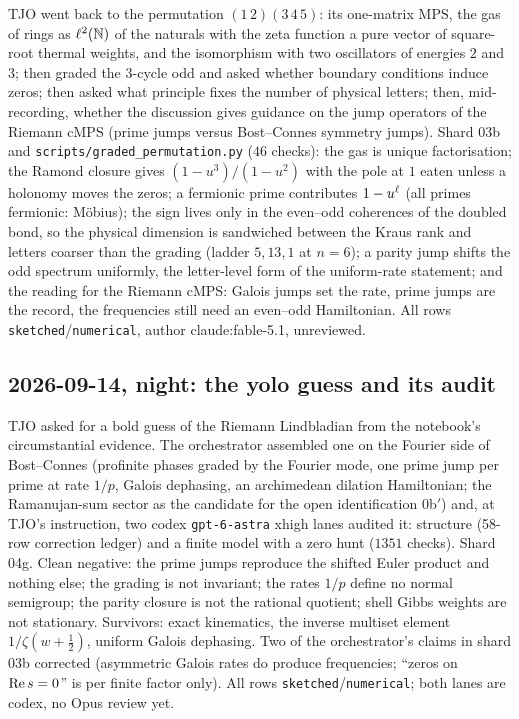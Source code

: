 TJO went back to the permutation $(1\,2)(3\,4\,5)$: its one-matrix MPS, the gas of rings as
$\ell^2(\mathbb N)$ of the naturals with the zeta function a pure vector of square-root thermal weights, and
the isomorphism with two oscillators of energies $2$ and $3$; then graded the $3$-cycle odd and
asked whether boundary conditions induce zeros; then asked what principle fixes the number of
physical letters; then, mid-recording, whether the discussion gives guidance on the jump operators
of the Riemann cMPS (prime jumps versus Bost--Connes symmetry jumps). Shard 03b and
\texttt{scripts/graded\_permutation.py} ($46$ checks): the gas is unique factorisation; the Ramond
closure gives $(1-u^3)/(1-u^2)$ with the pole at $1$ eaten unless a holonomy moves the zeros; a
fermionic prime contributes $1-u^{\ell}$ (all primes fermionic: M\"obius); the sign lives only in the
even--odd coherences of the doubled bond, so the physical dimension is sandwiched between the Kraus
rank and letters coarser than the grading (ladder $5,13,1$ at $n = 6$); a parity jump shifts the
odd spectrum uniformly, the letter-level form of the uniform-rate statement; and the reading for the
Riemann cMPS: Galois jumps set the rate, prime jumps are the record, the frequencies still need an
even--odd Hamiltonian. All rows \texttt{sketched}/\texttt{numerical}, author claude:fable-5.1, unreviewed.

\subsection*{2026-09-14, night: the yolo guess and its audit}

TJO asked for a bold guess of the Riemann Lindbladian from the notebook's circumstantial evidence.
The orchestrator assembled one on the Fourier side of Bost--Connes (profinite phases graded by the
Fourier mode, one prime jump per prime at rate $1/p$, Galois dephasing, an archimedean dilation
Hamiltonian; the Ramanujan-sum sector as the candidate for the open identification 0b$'$) and, at
TJO's instruction, two codex \texttt{gpt-6-astra} xhigh lanes audited it: structure (58-row correction
ledger) and a finite model with a zero hunt ($1351$ checks). Shard 04g. Clean negative: the prime jumps
reproduce the shifted Euler product and nothing else; the grading is not invariant; the rates $1/p$
define no normal semigroup; the parity closure is not the rational quotient; shell Gibbs weights are
not stationary. Survivors: exact kinematics, the inverse multiset element $1/\zeta(w+\tfrac12)$,
uniform Galois dephasing. Two of the orchestrator's claims in shard 03b corrected (asymmetric Galois
rates do produce frequencies; ``zeros on $\operatorname{Re} s = 0$'' is per finite factor only). All rows
\texttt{sketched}/\texttt{numerical}; both lanes are codex, no Opus review yet.

